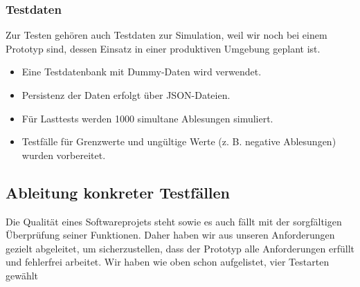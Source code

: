 \subsubsection{Testdaten}

Zur Testen gehören auch Testdaten zur Simulation, weil wir noch bei einem Prototyp sind, dessen Einsatz in einer produktiven Umgebung geplant ist.

\begin{itemize}
	\item Eine Testdatenbank mit Dummy-Daten wird verwendet.
	\item Persistenz der Daten erfolgt über JSON-Dateien.
	\item Für Lasttests werden 1000 simultane Ablesungen simuliert.
    \item Testfälle für Grenzwerte und ungültige Werte (z. B. negative Ablesungen) wurden vorbereitet.
\end{itemize}

\subsection{Ableitung konkreter Testfällen}

Die Qualität eines Softwareprojets steht sowie es auch fällt mit der sorgfältigen Überprüfung seiner Funktionen.
Daher haben wir aus unseren Anforderungen gezielt abgeleitet, um sicherzustellen, dass der Prototyp alle Anforderungen erfüllt und fehlerfrei arbeitet.
Wir haben wie oben schon aufgelistet, vier Testarten gewählt

\footnotesize


